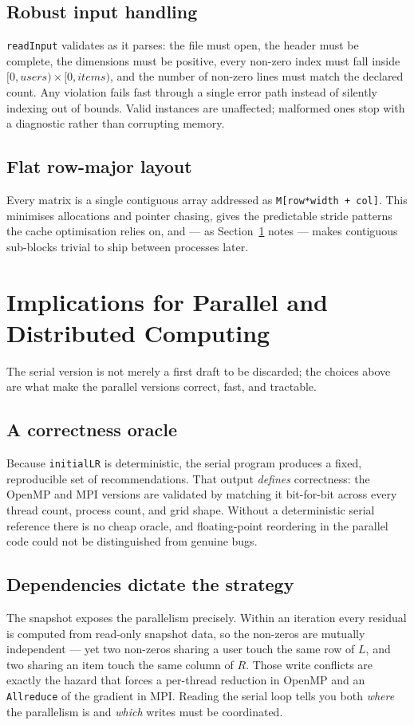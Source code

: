 \documentclass[twocolumn]{article}
\begin{document}
    \subsection{Robust input handling}\label{subsec:robust}
    \texttt{readInput} validates as it parses: the file must open, the header must be
    complete, the dimensions must be positive, every non-zero index must fall inside
    $[0, \textit{users}) \times [0, \textit{items})$, and the number of non-zero lines
    must match the declared count. Any violation fails fast through a single error path
    instead of silently indexing out of bounds. Valid instances are unaffected;
    malformed ones stop with a diagnostic rather than corrupting memory.

    \subsection{Flat row-major layout}\label{subsec:layout}
    Every matrix is a single contiguous array addressed as
    \texttt{M[row*width + col]}. This minimises allocations and pointer chasing, gives
    the predictable stride patterns the cache optimisation relies on, and --- as
    Section~\ref{sec:pdc} notes --- makes contiguous sub-blocks trivial to ship between
    processes later.


    \section{Implications for Parallel and Distributed Computing}\label{sec:pdc}
    The serial version is not merely a first draft to be discarded; the choices above are
    what make the parallel versions correct, fast, and tractable.

    \subsection{A correctness oracle}\label{subsec:oracle}
    Because \texttt{initialLR} is deterministic, the serial program produces a fixed,
    reproducible set of recommendations. That output \emph{defines} correctness: the
    OpenMP and MPI versions are validated by matching it bit-for-bit across every thread
    count, process count, and grid shape. Without a deterministic serial reference there
    is no cheap oracle, and floating-point reordering in the parallel code could not be
    distinguished from genuine bugs.

    \subsection{Dependencies dictate the strategy}\label{subsec:deps}
    The snapshot exposes the parallelism precisely. Within an iteration every
    residual is computed from read-only snapshot data, so the non-zeros are mutually
    independent --- yet two non-zeros sharing a user touch the same row of $L$, and two
    sharing an item touch the same column of $R$. Those write conflicts are exactly the
    hazard that forces a per-thread reduction in OpenMP and an \texttt{Allreduce} of the
    gradient in MPI. Reading the serial loop tells you both \emph{where} the parallelism
    is and \emph{which} writes must be coordinated.
\end{document}
